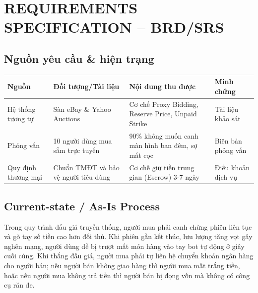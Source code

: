 \documentclass[11pt,a4paper]{article}
\begin{document}
\section{REQUIREMENTS SPECIFICATION -- BRD/SRS}

\subsection{Nguồn yêu cầu \& hiện trạng}
\begin{table}[H]
    \centering
    \small
    \begin{tabularx}{\textwidth}{|l|l|X|l|}
        \hline
        \textbf{Nguồn} & \textbf{Đối tượng/Tài liệu} & \textbf{Nội dung thu được} & \textbf{Minh chứng} \\ \hline
        Hệ thống tương tự & Sàn eBay \& Yahoo Auctions & Cơ chế Proxy Bidding, Reserve Price, Unpaid Strike & Tài liệu khảo sát \\ \hline
        Phỏng vấn & 10 người dùng mua sắm trực tuyến & 90\% không muốn canh màn hình ban đêm, sợ mất cọc & Biên bản phỏng vấn \\ \hline
        Quy định thương mại & Chuẩn TMĐT và bảo vệ người tiêu dùng & Cơ chế giữ tiền trung gian (Escrow) 3-7 ngày & Điều khoản dịch vụ \\ \hline
    \end{tabularx}
\end{table}

\subsection{Current-state / As-Is Process}
Trong quy trình đấu giá truyền thống, người mua phải canh chừng phiên liên tục và gõ tay số tiền cao hơn đối thủ. Khi phiên gần kết thúc, lưu lượng tăng vọt gây nghẽn mạng, người dùng dễ bị trượt mất món hàng vào tay bot tự động ở giây cuối cùng. Khi thắng đấu giá, người mua phải tự liên hệ chuyển khoản ngân hàng cho người bán; nếu người bán không giao hàng thì người mua mất trắng tiền, hoặc nếu người mua không trả tiền thì người bán bị đọng vốn mà không có công cụ răn đe.
\end{document}
